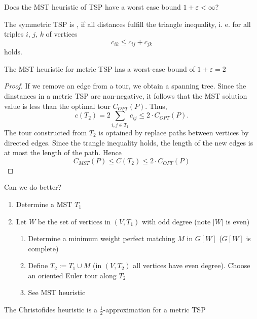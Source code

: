 \begin{qstn}[reformulated]
  Does the MST heuristic of TSP have a worst case bound $1+\varepsilon < \infty$?
\end{qstn}

\begin{defn}
  The symmetric TSP is , if all distances fulfill the triangle inequality, i. e. for all triples $i$, $j$, $k$ of vertices \[
    c_{ik}\leq c_{ij}+c_{jk}
  \] holds.
\end{defn}

\begin{thm}
  The MST heuristic for metric TSP has a worst-case bound of $1+\varepsilon=2$
\end{thm}
\begin{proof}
  If we remove an edge from a tour, we obtain a spanning tree. Since the dinstances in a metric TSP are non-negative, it follows that the MST solution value is less than the optimal tour $C_{OPT}(P)$. Thus, \[
    c(T_2) = 2 \sum_{i,j \in T_1} c_{ij} \leq 2  \cdot C_{OPT}(P).
  \] The tour constructed from $T_2$ is optained by replace paths between vertices by directed edges. Since the trangle inequality holds, the length of the new edges is at most the length of the path. Hence \[
    C_{MST}(P) \leq C(T_2) \leq 2 \cdot C_{OPT}(P)
  \]
\end{proof}
\begin{qstn}Can we do better? \end{qstn}
  \begin{enumerate}
    \item Determine a MST $T_1$
    \item Let $W$ be the set of vertices in $(V,T_1)$ with odd degree (note $|W|$ is even)
    \begin{enumerate}
      \item Determine a minimum weight perfect matching $M$ in $G[W]$ ($G[W]$ is complete)
      \item Define $T_2 := T_1 \cup M$ (in $(V,T_2)$ all vertices have even degree). Choose an oriented Euler tour along $T_2$
      \item See MST heuristic
    \end{enumerate}
  \end{enumerate}
  \begin{thm}
    The Christofides heuristic is a $\frac12$-approximation for a metric TSP
  \end{thm}
